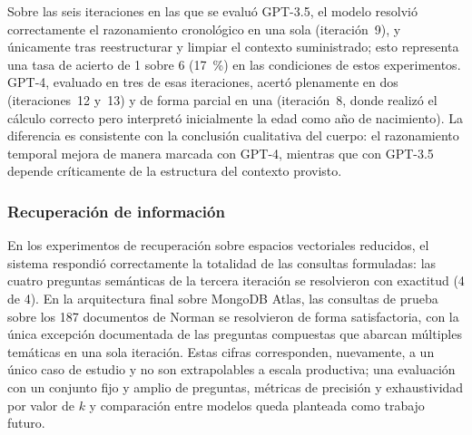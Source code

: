 Sobre las seis iteraciones en las que se evaluó GPT-3.5, el modelo resolvió correctamente el razonamiento cronológico en una sola (iteración~9), y únicamente tras reestructurar y limpiar el contexto suministrado; esto representa una tasa de acierto de 1 sobre 6 (17~\%) en las condiciones de estos experimentos. GPT-4, evaluado en tres de esas iteraciones, acertó plenamente en dos (iteraciones~12 y~13) y de forma parcial en una (iteración~8, donde realizó el cálculo correcto pero interpretó inicialmente la edad como año de nacimiento). La diferencia es consistente con la conclusión cualitativa del cuerpo: el razonamiento temporal mejora de manera marcada con GPT-4, mientras que con GPT-3.5 depende críticamente de la estructura del contexto provisto.

\subsubsection{Recuperación de información}

En los experimentos de recuperación sobre espacios vectoriales reducidos, el sistema respondió correctamente la totalidad de las consultas formuladas: las cuatro preguntas semánticas de la tercera iteración se resolvieron con exactitud (4 de 4). En la arquitectura final sobre MongoDB Atlas, las consultas de prueba sobre los 187 documentos de Norman se resolvieron de forma satisfactoria, con la única excepción documentada de las preguntas compuestas que abarcan múltiples temáticas en una sola iteración. Estas cifras corresponden, nuevamente, a un único caso de estudio y no son extrapolables a escala productiva; una evaluación con un conjunto fijo y amplio de preguntas, métricas de precisión y exhaustividad por valor de $k$ y comparación entre modelos queda planteada como trabajo futuro.
